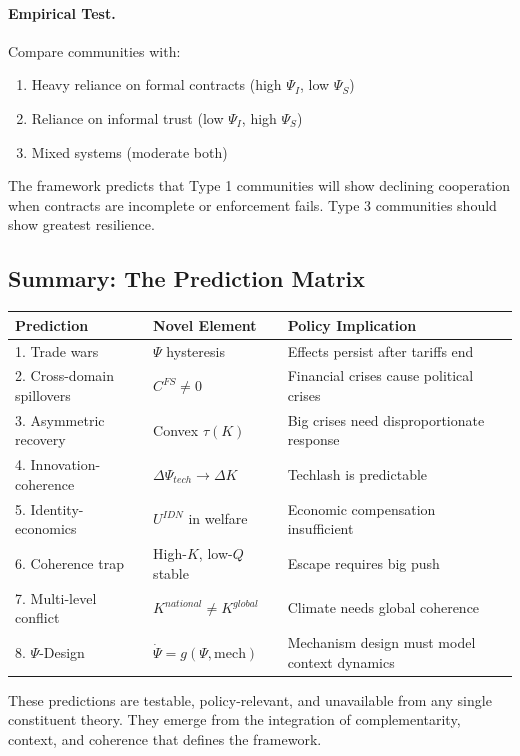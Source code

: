 \paragraph{Empirical Test.}
Compare communities with:
\begin{enumerate}
  \item Heavy reliance on formal contracts (high $\Psi_I$, low $\Psi_S$)
  \item Reliance on informal trust (low $\Psi_I$, high $\Psi_S$)
  \item Mixed systems (moderate both)
\end{enumerate}

The framework predicts that Type 1 communities will show declining cooperation
when contracts are incomplete or enforcement fails. Type 3 communities should
show greatest resilience.

\subsection{Summary: The Prediction Matrix}

\begin{center}
\renewcommand{\arraystretch}{1.3}
\begin{tabular}{lll}
\hline
\textbf{Prediction} & \textbf{Novel Element} & \textbf{Policy Implication} \\
\hline
1. Trade wars & $\Psi$ hysteresis & Effects persist after tariffs end \\
2. Cross-domain spillovers & $C^{FS} \neq 0$ & Financial crises cause political crises \\
3. Asymmetric recovery & Convex $\tau(K)$ & Big crises need disproportionate response \\
4. Innovation-coherence & $\Delta \Psi_{tech} \to \Delta K$ & Techlash is predictable \\
5. Identity-economics & $U^{IDN}$ in welfare & Economic compensation insufficient \\
6. Coherence trap & High-$K$, low-$Q$ stable & Escape requires big push \\
7. Multi-level conflict & $K^{national} \neq K^{global}$ & Climate needs global coherence \\
8. $\Psi$-Design & $\dot{\Psi} = g(\Psi, \text{mech})$ & Mechanism design must model context dynamics \\
\hline
\end{tabular}
\end{center}

These predictions are testable, policy-relevant, and unavailable from
any single constituent theory. They emerge from the integration of
complementarity, context, and coherence that defines the framework.


